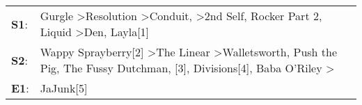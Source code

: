 \begin{supertabular}{p{0.03\textwidth}p{0.92\textwidth}}
 \textbf{S1}:  &                              Gurgle\textsuperscript{} \textgreater \enspace Resolution\textsuperscript{} \textgreater \enspace Conduit\textsuperscript{}, \textsuperscript{} \textgreater \enspace 2nd Self\textsuperscript{}, \enspace Rocker Part 2\textsuperscript{}, \enspace Liquid\textsuperscript{} \textgreater \enspace Den\textsuperscript{}, \enspace Layla[1]\textsuperscript{}  \enspace  \\
 \textbf{S2}:  &  Wappy Sprayberry[2]\textsuperscript{} \textgreater \enspace The Linear\textsuperscript{} \textgreater \enspace Walletsworth\textsuperscript{}, \enspace Push the Pig\textsuperscript{}, \enspace The Fussy Dutchman\textsuperscript{}, [3]\textsuperscript{}, \enspace Divisions[4]\textsuperscript{}, \enspace Baba O'Riley\textsuperscript{} \textgreater {}\textsuperscript{}  \enspace  \\
 \textbf{E1}:  &                                                                                                                                                                                                                                                                                                                                                                              JaJunk[5]\textsuperscript{}  \enspace  \\
\end{supertabular}
